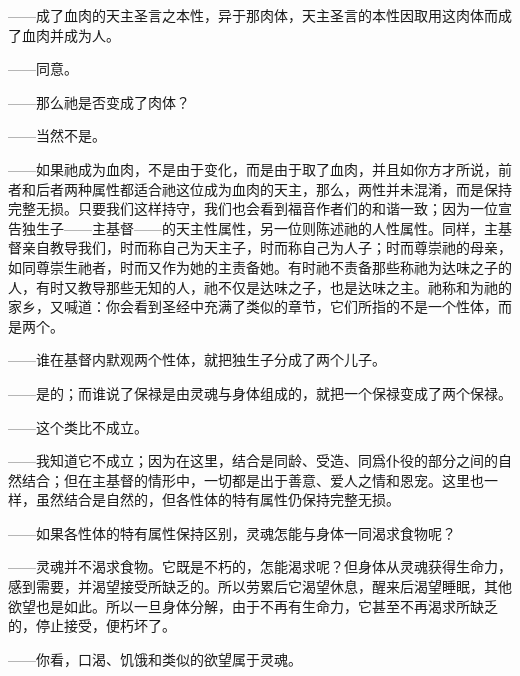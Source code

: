 ——成了血肉的天主圣言之本性，异于那肉体，天主圣言的本性因取用这肉体而成了血肉并成为人。\par

——同意。\par

——那么祂是否变成了肉体？\par

——当然不是。\par

——如果祂成为血肉，不是由于变化，而是由于取了血肉，并且如你方才所说，前者和后者两种属性都适合祂这位成为血肉的天主，那么，两性并未混淆，而是保持完整无损。只要我们这样持守，我们也会看到福音作者们的和谐一致；因为一位宣告独生子——主基督——的天主性属性，另一位则陈述祂的人性属性。同样，主基督亲自教导我们，时而称自己为天主子，时而称自己为人子；时而尊崇祂的母亲，如同尊崇生祂者，时而又作为她的主责备她。有时祂不责备那些称祂为达味之子的人，有时又教导那些无知的人，祂不仅是达味之子，也是达味之主。祂称和为祂的家乡，又喊道：你会看到圣经中充满了类似的章节，它们所指的不是一个性体，而是两个。\par

——谁在基督内默观两个性体，就把独生子分成了两个儿子。\par

——是的；而谁说了保禄是由灵魂与身体组成的，就把一个保禄变成了两个保禄。\par

——这个类比不成立。\par

——我知道它不成立；因为在这里，结合是同龄、受造、同爲仆役的部分之间的自然结合；但在主基督的情形中，一切都是出于善意、爱人之情和恩宠。这里也一样，虽然结合是自然的，但各性体的特有属性仍保持完整无损。\par

——如果各性体的特有属性保持区别，灵魂怎能与身体一同渴求食物呢？\par

——灵魂并不渴求食物。它既是不朽的，怎能渴求呢？但身体从灵魂获得生命力，感到需要，并渴望接受所缺乏的。所以劳累后它渴望休息，醒来后渴望睡眠，其他欲望也是如此。所以一旦身体分解，由于不再有生命力，它甚至不再渴求所缺乏的，停止接受，便朽坏了。\par

——你看，口渴、饥饿和类似的欲望属于灵魂。\par

